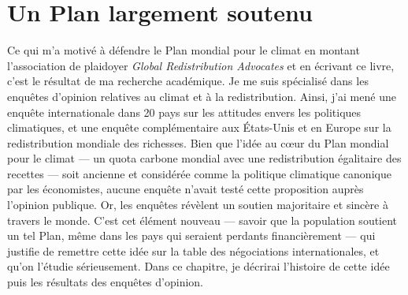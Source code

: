 \documentclass[a5paper,french]{memoir}
\begin{document}


\chapter{Un Plan largement soutenu\label{ch:soutien}}

Ce qui m'a motivé à défendre le Plan mondial pour le climat en montant l'association de plaidoyer \textit{Global Redistribution Advocates} et en écrivant ce livre, c'est le résultat de ma recherche académique. Je me suis spécialisé dans les enquêtes d'opinion relatives au climat et à la redistribution. Ainsi, j'ai mené une enquête internationale dans 20 pays sur les attitudes envers les politiques climatiques, et une enquête complémentaire aux États-Unis et en Europe sur la redistribution mondiale des richesses. Bien que l'idée au cœur du Plan mondial pour le climat --- un quota carbone mondial avec une redistribution égalitaire des recettes --- soit ancienne et considérée comme la politique climatique canonique par les économistes, aucune enquête n'avait testé cette proposition auprès l'opinion publique. Or, les enquêtes révèlent un soutien majoritaire et sincère à travers le monde. C'est cet élément nouveau --- savoir que la population soutient un tel Plan, même dans les pays qui seraient perdants financièrement --- qui justifie de remettre cette idée sur la table des négociations internationales, et qu'on l'étudie sérieusement. Dans ce chapitre, je décrirai l'histoire de cette idée puis les résultats des enquêtes d'opinion.
\end{document}
